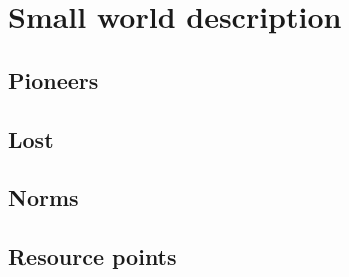 
\chapter{Small world description}

\section{Pioneers}
\label{sec:Pioneers}


\section{Lost}
\label{sec:Lost}


\section{Norms}
\label{sec:Norms}

\section{Resource points}
\label{sec:Resource Points}
